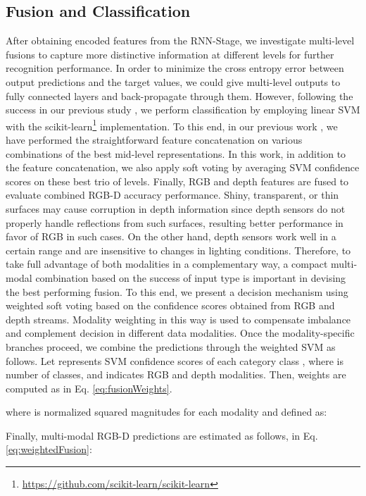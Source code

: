 \documentclass[10pt,journal,compsoc]{IEEEtran}
\begin{document}
\subsection{Fusion and Classification} \label{sec:fusionClassification}
After obtaining encoded features from the RNN-Stage, we investigate multi-level fusions to capture more distinctive information at different levels for further recognition performance. In order to minimize the cross entropy error between output predictions and the target values, we could give multi-level outputs to fully connected layers and back-propagate through them. However, following the success in our previous study \cite{Caglayan_ECCVW_2018}, we perform classification by employing linear SVM with the scikit-learn\footnote{\url{https://github.com/scikit-learn/scikit-learn}} \cite{Pedregosa_JMLR_2011_scikit} implementation. To this end, in our previous work \cite{Caglayan_ECCVW_2018}, we have performed the straightforward feature concatenation on various combinations of the best mid-level representations. In this work, in addition to the feature concatenation, we also apply soft voting by averaging SVM confidence scores on these best trio of levels. Finally, RGB and depth features are fused to evaluate combined RGB-D accuracy performance. Shiny, transparent, or thin surfaces may cause corruption in depth information since depth sensors do not properly handle reflections from such surfaces, resulting better performance in favor of RGB in such cases. On the other hand, depth sensors work well in a certain range and are insensitive to changes in lighting conditions. Therefore, to take full advantage of both modalities in a complementary way, a compact multi-modal combination based on the success of input type is important in devising the best performing fusion. To this end, we present a decision mechanism using weighted soft voting based on the confidence scores obtained from RGB and depth streams. Modality weighting in this way is used to compensate imbalance and complement decision in different data modalities. Once the modality-specific branches proceed, we combine the predictions through the weighted SVM as follows. Let  represents SVM confidence scores of each category class , where  is number of classes, and  indicates RGB and depth modalities. Then, weights  are computed as in Eq. \ref{eq:fusionWeights}. 

where  is normalized squared magnitudes for each modality and defined as:


Finally, multi-modal RGB-D predictions are estimated as follows, in Eq. \ref{eq:weightedFusion}:
\end{document}
